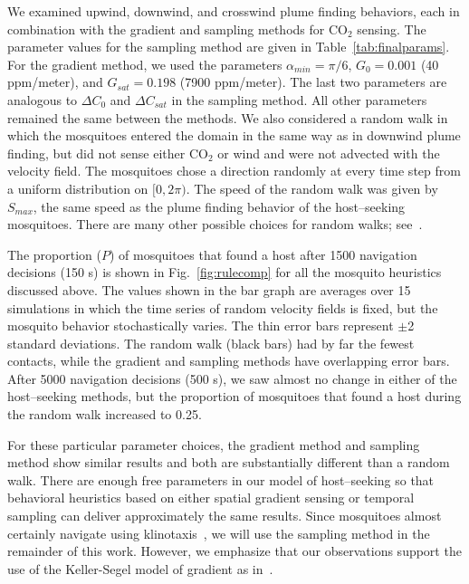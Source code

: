 \documentclass[10pt]{article}
\begin{document}
We examined upwind, downwind, and crosswind plume finding behaviors, each in combination with the gradient and sampling methods for CO$_2$ sensing. The parameter values for the sampling method are given in Table~\ref{tab:finalparams}. For the gradient method, we used the parameters $\alpha_{min} = \pi/6$, $G_0 = 0.001$ (40 ppm/meter), and $G_{sat}=0.198$ (7900 ppm/meter). The last two parameters are analogous to $\Delta C_0$ and $\Delta C_{sat}$ in the sampling method. All other parameters remained the same between the methods. We also considered a random walk in which the mosquitoes entered the domain in the same way as in downwind plume finding, but did not sense either CO$_2$ or wind and were not advected with the velocity field. The mosquitoes chose a direction randomly at every time step from a uniform distribution on $[0,2\pi)$. The speed of the random walk was given by $S_{max}$, the same speed as the plume finding behavior of the host--seeking mosquitoes. There are many other possible choices for random walks; see~\cite{Pasternak2009}.

The proportion ($P$) of mosquitoes that found a host after 1500 navigation decisions (150 s) is shown in Fig.~\ref{fig:rulecomp} for all the mosquito heuristics discussed above. The values shown in the bar graph are averages over 15 simulations in which the time series of random velocity fields is fixed, but the mosquito behavior stochastically varies. The thin error bars represent $\pm$2 standard deviations. The random walk (black bars) had by far the fewest contacts, while the gradient and sampling methods have overlapping error bars. After 5000 navigation decisions (500 s), we saw almost no change in either of the host--seeking methods, but the proportion of mosquitoes that found a host during the random walk increased to 0.25. 

For these particular parameter choices, the gradient method and sampling method show similar results and both are substantially different than a random walk. There are enough free parameters in our model of host--seeking so that behavioral heuristics based on either spatial gradient sensing or temporal sampling can deliver approximately the same results. Since mosquitoes almost certainly navigate using klinotaxis~\cite{Carde1996}, we will use the sampling method in the remainder of this work. However, we emphasize that our observations support the use of the Keller-Segel model of gradient as in~\cite{KellerSegel,Hortsmann}.


\end{document}
